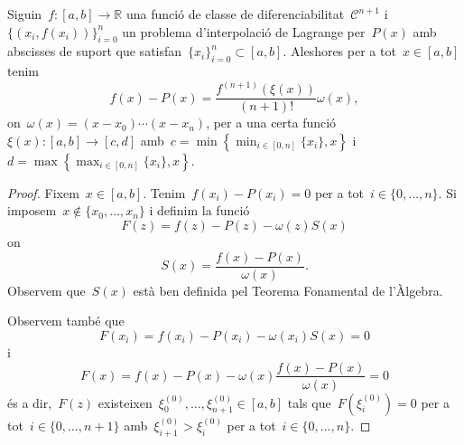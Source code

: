 \documentclass[../../main.tex]{subfiles}
\begin{document}
    \begin{theorem}\label{thm:primera fita de l'error en la interpolació de Lagrange}
        Siguin~\(f\colon[a,b]\longrightarrow\mathbb{R}\) una funció de classe de diferenciabilitat~\(\mathcal{C}^{n+1}\) i~\(\{(x_{i},f(x_{i}))\}_{i=0}^{n}\) un problema d'interpolació de Lagrange per~\(P(x)\) amb abscisses de suport que satisfan~\(\{x_{i}\}_{i=0}^{n}\subset[a,b]\).
        Aleshores per a tot~\(x\in[a,b]\) tenim
        \[
            f(x)-P(x)=\frac{f^{(n+1)}(\xi(x))}{(n+1)!}\omega(x),
        \]
        on~\(\omega(x)=(x-x_{0})\cdots(x-x_{n})\), per a una certa funció~\(\xi(x)\colon[a,b]\longrightarrow[c,d]\) amb~\(c=\min\left\{\min_{i\in[0,n]}\{x_{i}\},x\right\}\) i~\(d=\max\left\{\max_{i\in[0,n]}\{x_{i}\},x\right\}\).
        \begin{proof}
            Fixem~\(x\in[a,b]\).
            Tenim~\(f(x_{i})-P(x_{i})=0\) per a tot~\(i\in\{0,\dots,n\}\).
            Si imposem~\(x\notin\{x_{0},\dots,x_{n}\}\) i definim la funció
            \[
                F(z)=f(z)-P(z)-\omega(z)S(x)
            \]
            on
            \begin{equation}\label{eq:thm:primera fita de l'error en la interpolació de Lagrange 1}
            S(x)=\frac{f(x)-P(x)}{\omega(x)}.
            \end{equation}
            Observem que~\(S(x)\) està ben definida pel Teorema Fonamental de l'Àlgebra.

            Observem també que
            \[
                F(x_{i})=f(x_{i})-P(x_{i})-\omega(x_{i})S(x)=0
            \]
            i
            \[
                F(x)=f(x)-P(x)-\omega(x)\frac{f(x)-P(x)}{\omega(x)}=0
            \]
            és a dir,~\(F(z)\) existeixen~\(\xi^{(0)}_{0},\dots,\xi^{(0)}_{n+1}\in[a,b]\) tals que~\(F(\xi^{(0)}_{i})=0\) per a tot~\(i\in\{0,\dots,n+1\}\) amb~\(\xi^{(0)}_{i+1}>\xi^{(0)}_{i}\) per a tot~\(i\in\{0,\dots,n\}\).


\end{proof}
\end{theorem}
\end{document}
